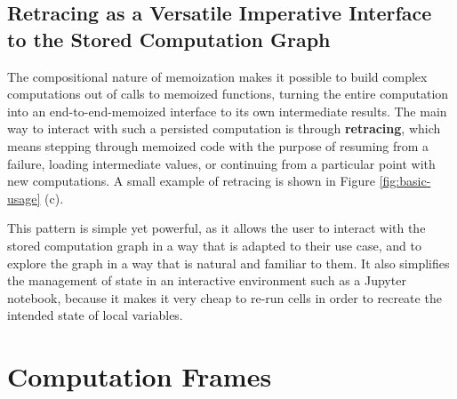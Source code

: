 \subsection{Retracing as a Versatile Imperative Interface to the Stored Computation Graph}
\label{subsection:retracing}

The compositional nature of memoization makes it possible to build complex
computations out of calls to memoized functions, turning the entire computation
into an end-to-end-memoized interface to its own intermediate results. The main
way to interact with such a persisted computation is through \textbf{retracing},
which means stepping through memoized code with the purpose of resuming from a
failure, loading intermediate values, or continuing from a particular point with
new computations. A small example of retracing is shown in Figure
\ref{fig:basic-usage} (c).

This pattern is simple yet powerful, as it allows the user to interact with the
stored computation graph in a way that is adapted to their use case, and to
explore the graph in a way that is natural and familiar to them. It also
simplifies the management of state in an interactive environment such as a
Jupyter notebook, because it makes it very cheap to re-run cells in order to recreate the intended state of local variables.

\section{Computation Frames}
\label{section:cf}

